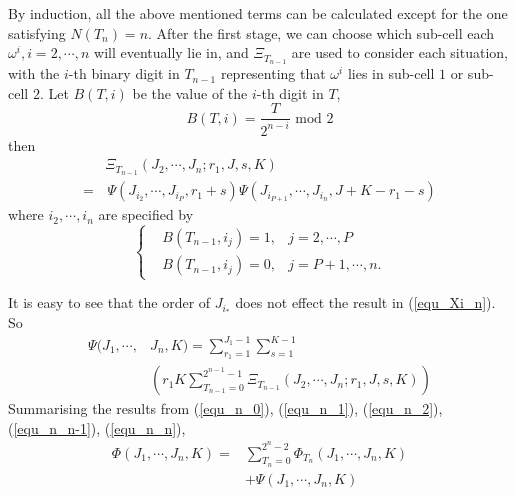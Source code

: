 \documentclass[conference]{IEEEtran}
\begin{document}
By induction, all the above mentioned terms can be calculated except for the one satisfying $N(T_n) = n$. %
After the first stage, we can choose which sub-cell each $\omega^i, i = 2, \cdots, n$ will eventually lie in, and $\Xi_{T_{n-1}}$ are used to consider each situation, with the $i$-th binary digit in $T_{n-1}$ representing that $\omega^i$ lies in sub-cell $1$ or sub-cell $2$. %
Let $B(T, i)$ be the value of the $i$-th digit in $T$,  
\begin{equation}
B(T, i) = \frac{T}{2^{n-i}}\mbox{ mod } 2
\end{equation}
then
\begin{equation}\label{equ_Xi_n}
\begin{aligned}
&\Xi_{T_{n-1}}(J_2, \cdots, J_n; r_1, J, s, K) \\
=&\, \Psi(J_{i_2}, \cdots, J_{i_P}, r_1+s)\Psi(J_{i_{P+1}}, \cdots, J_{i_n}, J+K-r_1-s)
\end{aligned}
\end{equation}
where $i_2, \cdots, i_n$ are specified by
\begin{equation}
\left\{
\begin{aligned}
&B(T_{n-1}, i_j) = 1, &j = 2, \cdots, P\\
&B(T_{n-1}, i_j) = 0, &j = P+1, \cdots, n.
\end{aligned}
\right.
\end{equation}

It is easy to see that the order of $J_{i_*}$ does not effect the result in (\ref{equ_Xi_n}). So
\begin{equation}\label{equ_n_n}
\begin{aligned}
\Psi(J_1, \cdots, &J_n, K) = \sum\limits_{r_1 = 1}^{J_1 - 1} \sum\limits_{s = 1}^{K-1}\\
&\left(r_1K \sum\limits_{T_{n-1} = 0	}^{2^{n-1}-1}\Xi_{T_{n-1}}(J_2, \cdots, J_n; r_1, J, s, K) \right)
\end{aligned}
\end{equation}
Summarising the results from (\ref{equ_n_0}), (\ref{equ_n_1}), (\ref{equ_n_2}), (\ref{equ_n_n-1}), (\ref{equ_n_n}), 
\begin{equation}
\begin{aligned}
\Phi(J_1, \cdots, J_n, K) = &\sum\limits_{T_n = 0}^{2^n-2}\Phi_{T_n}(J_1, \cdots, J_n, K)\\
& + \Psi(J_1, \cdots, J_n, K)
\end{aligned}
\end{equation}
\end{document}
